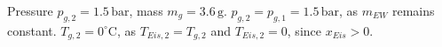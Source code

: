 Pressure \( p_{g,2} = 1.5 \, \text{bar} \), mass \( m_g = 3.6 \, \text{g} \).  
\( p_{g,2} = p_{g,1} = 1.5 \, \text{bar} \), as \( m_{EW} \) remains constant.  
\( T_{g,2} = 0^\circ \text{C} \), as \( T_{Eis,2} = T_{g,2} \) and \( T_{Eis,2} = 0 \), since \( x_{Eis} > 0 \).